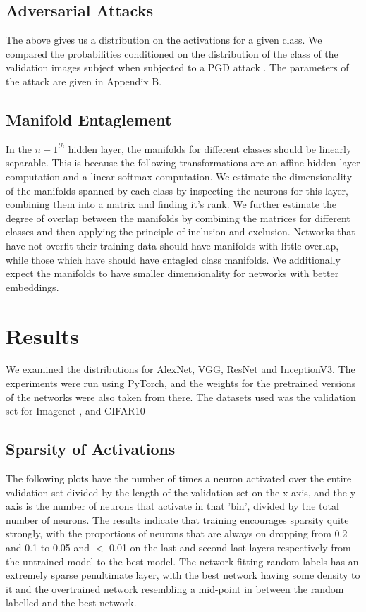 \documentclass{article}
\begin{document}
        \subsection{Adversarial Attacks}
            The above gives us a distribution on the activations for a given class. We compared the probabilities conditioned on the distribution of the class of the validation images subject when subjected to a PGD attack \cite{madry2019deeplearningmodelsresistant}. The parameters of the attack are given in Appendix B. 
        
        \subsection{Manifold Entaglement}
            In the $n-1^{th}$ hidden layer, the manifolds for different classes should be linearly separable. This is because the following transformations are an affine hidden layer computation and a linear softmax computation. We estimate the dimensionality of the manifolds spanned by each class by inspecting the neurons for this layer, combining them into a matrix and finding it's rank. We further estimate the degree of overlap between the manifolds by combining the matrices for different classes and then applying the principle of inclusion and exclusion. Networks that have not overfit their training data should have manifolds with little overlap, while those which have should have entagled class manifolds. We additionally expect the manifolds to have smaller dimensionality for networks with better embeddings. 

    \section{Results}
        We examined the distributions for AlexNet, VGG, ResNet and InceptionV3. The experiments were run using PyTorch, and the weights for the pretrained versions of the networks were also taken from there. The datasets used was the validation set for Imagenet \cite{russakovsky2015imagenetlargescalevisual}, and CIFAR10 \cite{Krizhevsky2009LearningML}
        \subsection{Sparsity of Activations}
            The following plots have the number of times a neuron activated over the entire validation set divided by the length of the validation set on the x axis, and the y-axis is the number of neurons that activate in that 'bin', divided by the total number of neurons.
            The results indicate that training encourages sparsity quite strongly, with the proportions of neurons that are always on dropping from 0.2 and 0.1 to 0.05 and $<$ 0.01 on the last and second last layers respectively from the untrained model to the best model. The network fitting random labels has an extremely sparse penultimate layer, with the best network having some density to it and the overtrained network resembling a mid-point in between the random labelled and the best network. 
            
\end{document}
